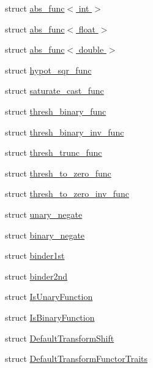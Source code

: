 \begin{DoxyCompactItemize}
\item 
struct \hyperlink{structcv_1_1gpu_1_1device_1_1abs__func_3_01int_01_4}{abs\-\_\-func$<$ int $>$}
\item 
struct \hyperlink{structcv_1_1gpu_1_1device_1_1abs__func_3_01float_01_4}{abs\-\_\-func$<$ float $>$}
\item 
struct \hyperlink{structcv_1_1gpu_1_1device_1_1abs__func_3_01double_01_4}{abs\-\_\-func$<$ double $>$}
\item 
struct \hyperlink{structcv_1_1gpu_1_1device_1_1hypot__sqr__func}{hypot\-\_\-sqr\-\_\-func}
\item 
struct \hyperlink{structcv_1_1gpu_1_1device_1_1saturate__cast__func}{saturate\-\_\-cast\-\_\-func}
\item 
struct \hyperlink{structcv_1_1gpu_1_1device_1_1thresh__binary__func}{thresh\-\_\-binary\-\_\-func}
\item 
struct \hyperlink{structcv_1_1gpu_1_1device_1_1thresh__binary__inv__func}{thresh\-\_\-binary\-\_\-inv\-\_\-func}
\item 
struct \hyperlink{structcv_1_1gpu_1_1device_1_1thresh__trunc__func}{thresh\-\_\-trunc\-\_\-func}
\item 
struct \hyperlink{structcv_1_1gpu_1_1device_1_1thresh__to__zero__func}{thresh\-\_\-to\-\_\-zero\-\_\-func}
\item 
struct \hyperlink{structcv_1_1gpu_1_1device_1_1thresh__to__zero__inv__func}{thresh\-\_\-to\-\_\-zero\-\_\-inv\-\_\-func}
\item 
struct \hyperlink{structcv_1_1gpu_1_1device_1_1unary__negate}{unary\-\_\-negate}
\item 
struct \hyperlink{structcv_1_1gpu_1_1device_1_1binary__negate}{binary\-\_\-negate}
\item 
struct \hyperlink{structcv_1_1gpu_1_1device_1_1binder1st}{binder1st}
\item 
struct \hyperlink{structcv_1_1gpu_1_1device_1_1binder2nd}{binder2nd}
\item 
struct \hyperlink{structcv_1_1gpu_1_1device_1_1IsUnaryFunction}{Is\-Unary\-Function}
\item 
struct \hyperlink{structcv_1_1gpu_1_1device_1_1IsBinaryFunction}{Is\-Binary\-Function}
\item 
struct \hyperlink{structcv_1_1gpu_1_1device_1_1DefaultTransformShift}{Default\-Transform\-Shift}
\item 
struct \hyperlink{structcv_1_1gpu_1_1device_1_1DefaultTransformFunctorTraits}{Default\-Transform\-Functor\-Traits}
\item 

\end{DoxyCompactItemize}
